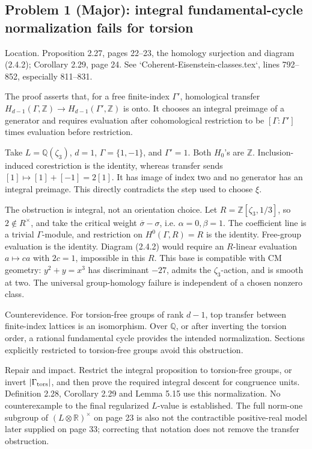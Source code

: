 \documentclass[10pt]{article}
\begin{document}
\subsection*{Problem 1 (Major): integral fundamental-cycle normalization fails for torsion}
Location. Proposition 2.27, pages 22–23, the homology surjection and diagram (2.4.2); Corollary 2.29, page 24. See `Coherent-Eisenstein-classes.tex`, lines 792–852, especially 811–831.\par
The proof asserts that, for a free finite-index \(\Gamma'\), homological transfer \(H_{d-1}(\Gamma,\mathbb Z)\to H_{d-1}(\Gamma',\mathbb Z)\) is onto. It chooses an integral preimage of a generator and requires evaluation after cohomological restriction to be \([\Gamma:\Gamma']\) times evaluation before restriction.\par
Take \(L=\mathbb Q(\zeta_3)\), \(d=1\), \(\Gamma=\{1,-1\}\), and \(\Gamma'=1\). Both \(H_0\)’s are \(\mathbb Z\). Inclusion-induced corestriction is the identity, whereas transfer sends \([1]\mapsto[1]+[-1]=2[1]\). It has image of index two and no generator has an integral preimage. This directly contradicts the step used to choose \(\xi\).\par
The obstruction is integral, not an orientation choice. Let \(R=\mathbb Z[\zeta_3,1/3]\), so \(2\notin R^\times\), and take the critical weight \(\overline\sigma-\sigma\), i.e. \(\alpha=0,\beta=1\). The coefficient line is a trivial \(\Gamma\)-module, and restriction on \(H^0(\Gamma,R)=R\) is the identity. Free-group evaluation is the identity. Diagram (2.4.2) would require an \(R\)-linear evaluation \(a\mapsto ca\) with \(2c=1\), impossible in this \(R\). This base is compatible with CM geometry: \(y^2+y=x^3\) has discriminant \(-27\), admits the \(\zeta_3\)-action, and is smooth at two. The universal group-homology failure is independent of a chosen nonzero class.\par
Counterevidence. For torsion-free groups of rank \(d-1\), top transfer between finite-index lattices is an isomorphism. Over \(\mathbb Q\), or after inverting the torsion order, a rational fundamental cycle provides the intended normalization. Sections explicitly restricted to torsion-free groups avoid this obstruction.\par
Repair and impact. Restrict the integral proposition to torsion-free groups, or invert \(|\Gamma_{\rm tors}|\), and then prove the required integral descent for congruence units. Definition 2.28, Corollary 2.29 and Lemma 5.15 use this normalization. No counterexample to the final regularized \(L\)-value is established. The full norm-one subgroup of \((L\otimes\mathbb R)^\times\) on page 23 is also not the contractible positive-real model later supplied on page 33; correcting that notation does not remove the transfer obstruction.\par
\end{document}
